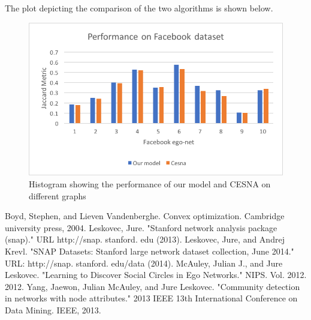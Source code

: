 \documentclass[11pt]{article}
\begin{document}
The plot depicting the comparison of the two algorithms is shown below.
\begin{figure}[H]
\begin{center}
\includegraphics[scale=1]{plot.png}
\caption{Histogram showing the performance of our model and CESNA on different graphs}
\end{center}
\end{figure}
\begin{thebibliography}{3}
Boyd, Stephen, and Lieven Vandenberghe. Convex optimization. Cambridge university press, 2004.
Leskovec, Jure. "Stanford network analysis package (snap)." URL http://snap. stanford. edu (2013).
Leskovec, Jure, and Andrej Krevl. "SNAP Datasets: Stanford large network dataset collection, June 2014." URL: http://snap. stanford. edu/data (2014).
McAuley, Julian J., and Jure Leskovec. "Learning to Discover Social Circles in Ego Networks." NIPS. Vol. 2012. 2012.
Yang, Jaewon, Julian McAuley, and Jure Leskovec. "Community detection in networks with node attributes." 2013 IEEE 13th International Conference on Data Mining. IEEE, 2013.
\end{thebibliography}
\end{document}
